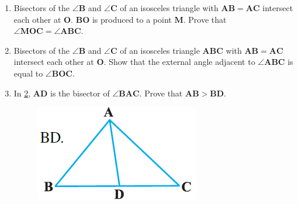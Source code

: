 \documentclass{article}
\let\vec\mathbf
\begin{document}
\begin{enumerate}
\begin{figure}[h]
	\caption{}
	\label{fig:7.3.8}
\end{figure}
\item Bisectors of the $\angle \vec{B}$ and $\angle \vec{C}$ of an isosceles triangle with $\vec{AB=AC}$ intersect each other at $\vec{O}$. $\vec{BO}$ is produced to a point $\vec{M}$. Prove that $\angle \vec{MOC}= \angle \vec{ABC}$.
\item Bisectors of the $\angle \vec{B}$ and $\angle \vec{C}$ of an isosceles triangle $\vec{ABC}$ with $\vec{AB=AC}$ intersect each other at $\vec{O}$. Show that the external angle adjacent to $\angle \vec{ABC}$ is equal to $\angle \vec{BOC}$.
\pagebreak
\item In \ref{fig:7.3.11}, $\vec{AD}$ is the bisector of $\angle \vec{BAC}$. Prove that $\vec{AB>BD}$.
\begin{figure}[h]
	\centering
	\includegraphics[width=\columnwidth]{figs/Figure5.png}
	\caption{}
	\label{fig:7.3.11}
\end{figure}
\end{enumerate}
\end{document}
